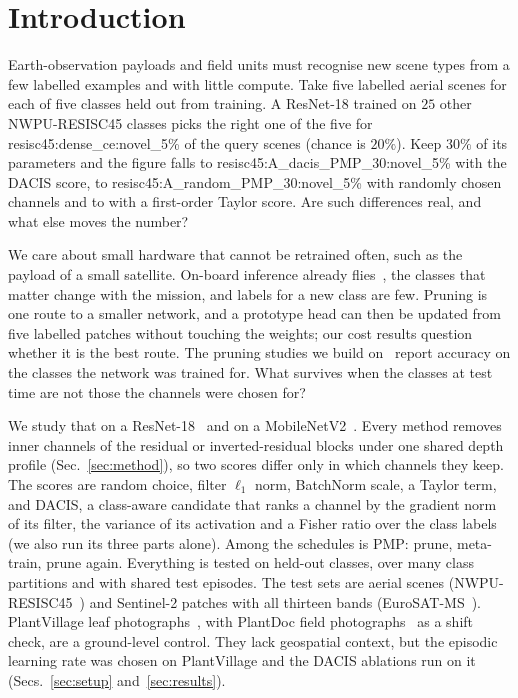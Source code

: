 \section{Introduction}
\label{sec:intro}

Earth-observation payloads and field units must recognise new scene types from a few labelled examples and with little compute. Take five labelled aerial scenes for each of five classes held out from training. A ResNet-18 trained on $25$ other NWPU-RESISC45 classes picks the right one of the five for \num{resisc45:dense_ce:novel_5}\% of the query scenes (chance is $20\%$). Keep $30\%$ of its parameters and the figure falls to \num{resisc45:A_dacis_PMP_30:novel_5}\% with the DACIS score, to \num{resisc45:A_random_PMP_30:novel_5}\% with randomly chosen channels and to  with a first-order Taylor score. Are such differences real, and what else moves the number?

We care about small hardware that cannot be retrained often, such as the payload of a small satellite. On-board inference already flies~\cite{giuffrida2020cloudscout,giuffrida2022phisat}, the classes that matter change with the mission, and labels for a new class are few. Pruning is one route to a smaller network, and a prototype head can then be updated from five labelled patches without touching the weights; our cost results question whether it is the best route. The pruning studies we build on~\cite{li2017pruning,liu2017slimming,molchanov2017pruning,he2017channel} report accuracy on the classes the network was trained for. What survives when the classes at test time are not those the channels were chosen for?

We study that on a ResNet-18~\cite{he2016resnet} and on a MobileNetV2~\cite{sandler2018mobilenetv2}. Every method removes inner channels of the residual or inverted-residual blocks under one shared depth profile (Sec.~\ref{sec:method}), so two scores differ only in which channels they keep. The scores are random choice, filter $\ell_1$ norm, BatchNorm scale, a Taylor term, and DACIS, a class-aware candidate that ranks a channel by the gradient norm of its filter, the variance of its activation and a Fisher ratio over the class labels (we also run its three parts alone). Among the schedules is PMP: prune, meta-train, prune again. Everything is tested on held-out classes, over many class partitions and with shared test episodes. The test sets are aerial scenes (NWPU-RESISC45~\cite{cheng2017resisc}) and Sentinel-2 patches with all thirteen bands (EuroSAT-MS~\cite{helber2019eurosat}). PlantVillage leaf photographs~\cite{hughes2015plantvillage}, with PlantDoc field photographs~\cite{singh2020plantdoc} as a shift check, are a ground-level control. They lack geospatial context, but the episodic learning rate was chosen on PlantVillage and the DACIS ablations run on it (Secs.~\ref{sec:setup} and~\ref{sec:results}).

